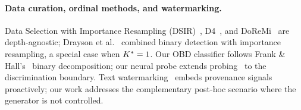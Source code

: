 \paragraph{Data curation, ordinal methods, and watermarking.}
Data Selection with Importance Resampling (DSIR)~\cite{xie2023dsir}, D4~\cite{tirumala2023d4}, and DoReMi~\cite{xie2023doremi} are depth-agnostic; Drayson et al.~\cite{drayson2025} combined binary detection with importance resampling, a special case when ${K^*} = 1$.
Our OBD classifier follows Frank \& Hall's~\cite{frank2001ordinal} binary decomposition; our neural probe extends probing~\cite{alain2017understanding, belinkov2022probing} to the discrimination boundary.
Text watermarking~\cite{kirchenbauer2023watermark} embeds provenance signals proactively; our work addresses the complementary post-hoc scenario where the generator is not controlled.
